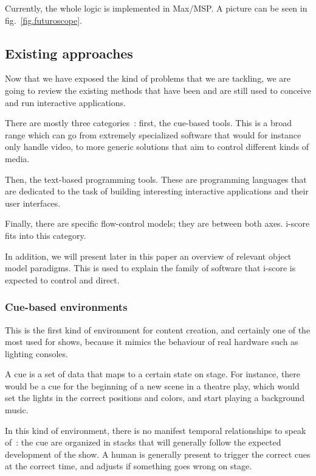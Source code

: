 \documentclass{sigchi}
\begin{document}
Currently, the whole logic is implemented in Max/MSP. A picture can be seen in fig.~\ref{fig.futuroscope}.


\subsection{Existing approaches}
Now that we have exposed the kind of problems that we are tackling, we are going to review the existing methods that have been and are still used to conceive and run interactive applications.

There are mostly three categories~: first, the cue-based tools. This is a broad range which can go from extremely specialized software that would for instance only handle video, to more generic solutions that aim to control different kinds of media.

Then, the text-based programming tools. These are programming languages that are dedicated to the task of building interesting interactive applications and their user interfaces.

Finally, there are specific flow-control models; they are between both axes. i-score fits into this category.

In addition, we will present later in this paper an overview of relevant object model paradigms. This is used to explain the family of software that i-score is expected to control and direct. %

\subsubsection{Cue-based environments}
This is the first kind of environment for content creation, and certainly one of the most used for shows, because it mimics the behaviour of real hardware such as lighting consoles.

A cue is a set of data that maps to a certain state on stage. For instance, there would be a cue for the beginning of a new scene in a theatre play, which would set the lights in the correct positions and colors, and start playing a background music.

In this kind of environment, there is no manifest temporal relationships to speak of~: the cue are organized in stacks that will generally follow the expected development of the show. A human is generally present to trigger the correct cues at the correct time, and adjusts if something goes wrong on stage.
\end{document}
